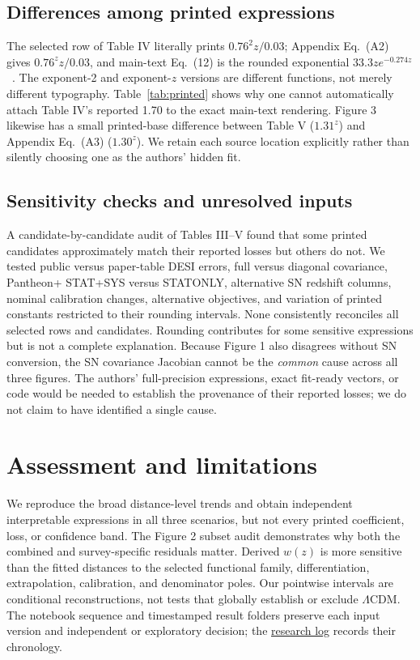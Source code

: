 \documentclass[11pt]{article}
\begin{document}
\subsection{Differences among printed expressions}
The selected row of Table IV literally prints $0.76^{2}z/0.03$; Appendix Eq.~(A2) gives $0.76^{z}z/0.03$, and main-text Eq.~(12) is the rounded exponential $33.3ze^{-0.274z}$~\cite{SousaNeto2025}. The exponent-2 and exponent-$z$ versions are different functions, not merely different typography. Table~\ref{tab:printed} shows why one cannot automatically attach Table IV's reported 1.70 to the exact main-text rendering. Figure 3 likewise has a small printed-base difference between Table V ($1.31^z$) and Appendix Eq.~(A3) ($1.30^z$). We retain each source location explicitly rather than silently choosing one as the authors' hidden fit.

\subsection{Sensitivity checks and unresolved inputs}
A candidate-by-candidate audit of Tables III--V found that some printed candidates approximately match their reported losses but others do not. We tested public versus paper-table DESI errors, full versus diagonal covariance, Pantheon+ STAT+SYS versus STATONLY, alternative SN redshift columns, nominal calibration changes, alternative objectives, and variation of printed constants restricted to their rounding intervals. None consistently reconciles all selected rows and candidates. Rounding contributes for some sensitive expressions but is not a complete explanation. Because Figure 1 also disagrees without SN conversion, the SN covariance Jacobian cannot be the \emph{common} cause across all three figures. The authors' full-precision expressions, exact fit-ready vectors, or code would be needed to establish the provenance of their reported losses; we do not claim to have identified a single cause.

\section{Assessment and limitations}
We reproduce the broad distance-level trends and obtain independent interpretable expressions in all three scenarios, but not every printed coefficient, loss, or confidence band. The Figure 2 subset audit demonstrates why both the combined and survey-specific residuals matter. Derived $w(z)$ is more sensitive than the fitted distances to the selected functional family, differentiation, extrapolation, calibration, and denominator poles. Our pointwise intervals are conditional reconstructions, not tests that globally establish or exclude $\Lambda$CDM. The notebook sequence and timestamped result folders preserve each input version and independent or exploratory decision; the \href{https://app.notion.com/p/dbe79fe1f4924b4ba836b4b8a788eee6}{research log} records their chronology.
\end{document}
